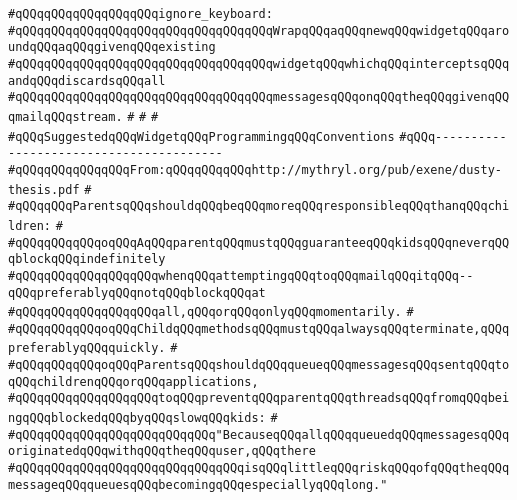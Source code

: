 \verb|#qQQqqQQqqQQqqQQqqQQqignore_keyboard:|\newline
\verb|#qQQqqQQqqQQqqQQqqQQqqQQqqQQqqQQqqQQqWrapqQQqaqQQqnewqQQqwidgetqQQqaroundqQQqaqQQqgivenqQQqexisting|\newline
\verb|#qQQqqQQqqQQqqQQqqQQqqQQqqQQqqQQqqQQqwidgetqQQqwhichqQQqinterceptsqQQqandqQQqdiscardsqQQqall|\newline
\verb|#qQQqqQQqqQQqqQQqqQQqqQQqqQQqqQQqqQQqmessagesqQQqonqQQqtheqQQqgivenqQQqmailqQQqstream.|\newline
\verb|#|\newline
\verb|#|\newline
\verb|#|\newline
\verb|#qQQqSuggestedqQQqWidgetqQQqProgrammingqQQqConventions|\newline
\verb|#qQQq----------------------------------------|\newline
\verb|#qQQqqQQqqQQqqQQqFrom:qQQqqQQqqQQqhttp://mythryl.org/pub/exene/dusty-thesis.pdf|\newline
\verb|#|\newline
\verb|#qQQqqQQqParentsqQQqshouldqQQqbeqQQqmoreqQQqresponsibleqQQqthanqQQqchildren:|\newline
\verb|#|\newline
\verb|#qQQqqQQqqQQqoqQQqAqQQqparentqQQqmustqQQqguaranteeqQQqkidsqQQqneverqQQqblockqQQqindefinitely|\newline
\verb|#qQQqqQQqqQQqqQQqqQQqwhenqQQqattemptingqQQqtoqQQqmailqQQqitqQQq--qQQqpreferablyqQQqnotqQQqblockqQQqat|\newline
\verb|#qQQqqQQqqQQqqQQqqQQqall,qQQqorqQQqonlyqQQqmomentarily.|\newline
\verb|#|\newline
\verb|#qQQqqQQqqQQqoqQQqChildqQQqmethodsqQQqmustqQQqalwaysqQQqterminate,qQQqpreferablyqQQqquickly.|\newline
\verb|#|\newline
\verb|#qQQqqQQqqQQqoqQQqParentsqQQqshouldqQQqqueueqQQqmessagesqQQqsentqQQqtoqQQqchildrenqQQqorqQQqapplications,|\newline
\verb|#qQQqqQQqqQQqqQQqqQQqtoqQQqpreventqQQqparentqQQqthreadsqQQqfromqQQqbeingqQQqblockedqQQqbyqQQqslowqQQqkids:|\newline
\verb|#|\newline
\verb|#qQQqqQQqqQQqqQQqqQQqqQQqqQQq"BecauseqQQqallqQQqqueuedqQQqmessagesqQQqoriginatedqQQqwithqQQqtheqQQquser,qQQqthere|\newline
\verb|#qQQqqQQqqQQqqQQqqQQqqQQqqQQqqQQqisqQQqlittleqQQqriskqQQqofqQQqtheqQQqmessageqQQqqueuesqQQqbecomingqQQqespeciallyqQQqlong."|\newline
